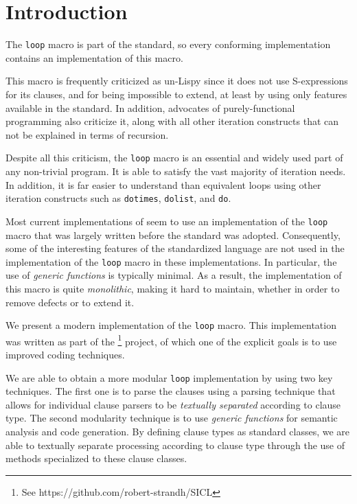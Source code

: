 \section{Introduction}
\label{sec-introduction}

The \texttt{loop} macro is part of the \commonlisp{} standard, so
every conforming \commonlisp{} implementation contains an
implementation of this macro. 

This macro is frequently criticized as un-Lispy since it does not use
S-expressions for its clauses, and for being impossible to extend, at
least by using only features available in the \commonlisp{} standard.
In addition, advocates of purely-functional programming also criticize
it, along with all other iteration constructs that can not be
explained in terms of recursion.

Despite all this criticism, the \texttt{loop} macro is an essential
and widely used part of any non-trivial \commonlisp{} program.  It is
able to satisfy the vast majority of iteration needs.  In addition, it
is far easier to understand than equivalent loops using other
iteration constructs such as \texttt{dotimes}, \texttt{dolist}, and
\texttt{do}.

Most current implementations of \commonlisp{} seem to use an
implementation of the \texttt{loop} macro that was largely written
before the \commonlisp{} standard was adopted.  Consequently, some of
the interesting features of the standardized \commonlisp{} language
are not used in the implementation of the \texttt{loop} macro in
these implementations.  In particular, the use of \emph{generic
  functions} is typically minimal.  As a result, the implementation of
this macro is quite \emph{monolithic}, making it hard to maintain,
whether in order to remove defects or to extend it.

We present a modern implementation of the \texttt{loop} macro.  This
implementation was written as part of the \sicl{}%
\footnote{See https://github.com/robert-strandh/SICL} project, of
which one of the explicit goals is to use improved coding techniques.

We are able to obtain a more modular \texttt{loop} implementation by
using two key techniques.  The first one is to parse the clauses using
a parsing technique that allows for individual clause parsers to be
\emph{textually separated} according to clause type.  The second
modularity technique is to use \emph{generic functions} for semantic
analysis and code generation.  By defining clause types as standard
classes, we are able to textually separate processing according to
clause type through the use of methods specialized to these clause
classes.

